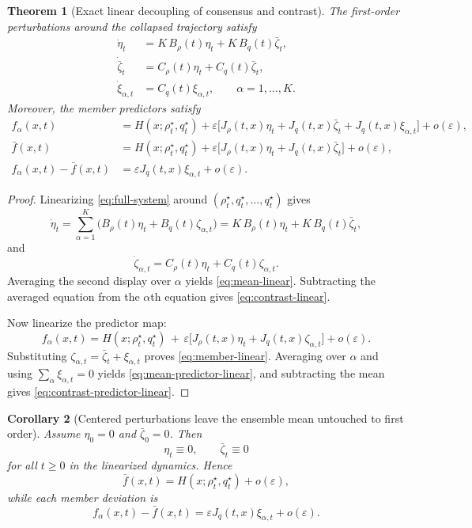 \documentclass[11pt]{article}
\newtheorem{theorem}{Theorem}
\newtheorem{corollary}[theorem]{Corollary}
\theoremstyle{remark}
\begin{document}
\begin{theorem}[Exact linear decoupling of consensus and contrast]
\label{thm:contrast-decoupling}
The first-order perturbations around the collapsed trajectory satisfy
\begin{align}
\dot\eta_t &= K\,B_\rho(t)\eta_t + K\,B_q(t)\bar\zeta_t,
\label{eq:eta-linear}\\
\dot{\bar\zeta}_t &= C_\rho(t)\eta_t + C_q(t)\bar\zeta_t,
\label{eq:mean-linear}\\
\dot\xi_{\alpha,t} &= C_q(t)\xi_{\alpha,t},
\qquad
\alpha=1,\dots,K.
\label{eq:contrast-linear}
\end{align}
Moreover, the member predictors satisfy
\begin{align}
f_\alpha(x,t)
&=
H(x;\rho_t^\star,q_t^\star)
 + \varepsilon\bigl[J_\rho(t,x)\eta_t + J_q(t,x)\bar\zeta_t + J_q(t,x)\xi_{\alpha,t}\bigr]
 + o(\varepsilon),
\label{eq:member-linear}\\
\bar f(x,t)
&=
H(x;\rho_t^\star,q_t^\star)
 + \varepsilon\bigl[J_\rho(t,x)\eta_t + J_q(t,x)\bar\zeta_t\bigr]
 + o(\varepsilon),
\label{eq:mean-predictor-linear}\\
f_\alpha(x,t)-\bar f(x,t)
&=
\varepsilon J_q(t,x)\xi_{\alpha,t} + o(\varepsilon).
\label{eq:contrast-predictor-linear}
\end{align}
\end{theorem}

\begin{proof}
Linearizing \eqref{eq:full-system} around $(\rho_t^\star,q_t^\star,\dots,q_t^\star)$ gives
\[
\dot\eta_t
=
\sum_{\alpha=1}^K \bigl(B_\rho(t)\eta_t + B_q(t)\zeta_{\alpha,t}\bigr)
=
K\,B_\rho(t)\eta_t + K\,B_q(t)\bar\zeta_t,
\]
and
\[
\dot\zeta_{\alpha,t}
=
C_\rho(t)\eta_t + C_q(t)\zeta_{\alpha,t}.
\]
Averaging the second display over $\alpha$ yields \eqref{eq:mean-linear}. Subtracting the averaged equation from the $\alpha$th equation gives \eqref{eq:contrast-linear}.

Now linearize the predictor map:
\[
f_\alpha(x,t)
=
H(x;\rho_t^\star,q_t^\star)
\,+\,
\varepsilon\bigl[J_\rho(t,x)\eta_t + J_q(t,x)\zeta_{\alpha,t}\bigr]
 + o(\varepsilon).
\]
Substituting $\zeta_{\alpha,t}=\bar\zeta_t+\xi_{\alpha,t}$ proves \eqref{eq:member-linear}. Averaging over $\alpha$ and using $\sum_\alpha \xi_{\alpha,t}=0$ yields \eqref{eq:mean-predictor-linear}, and subtracting the mean gives \eqref{eq:contrast-predictor-linear}.
\end{proof}

\begin{corollary}[Centered perturbations leave the ensemble mean untouched to first order]
\label{cor:centered-first-order}
Assume $\eta_0=0$ and $\bar\zeta_0=0$. Then
\[
\eta_t \equiv 0,
\qquad
\bar\zeta_t \equiv 0
\]
for all $t \ge 0$ in the linearized dynamics. Hence
\[
\bar f(x,t)
=
H(x;\rho_t^\star,q_t^\star)
 + o(\varepsilon),
\]
while each member deviation is
\[
f_\alpha(x,t)-\bar f(x,t)
=
\varepsilon J_q(t,x)\xi_{\alpha,t} + o(\varepsilon).
\]
\end{corollary}
\end{document}
